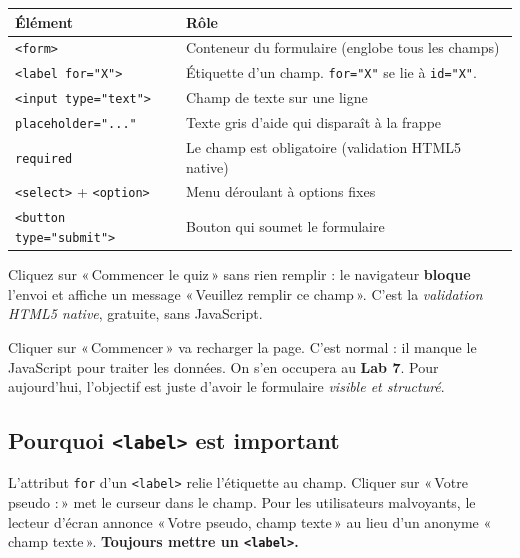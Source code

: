 \documentclass[11pt,a4paper]{article}
\begin{document}
\begin{center}
\begin{tabular}{@{}lp{8.5cm}@{}}
\toprule
\textbf{Élément} & \textbf{Rôle} \\
\midrule
\texttt{<form>} & Conteneur du formulaire (englobe tous les champs) \\
\addlinespace
\texttt{<label for="X">} & Étiquette d'un champ. \texttt{for="X"} se lie à \texttt{id="X"}. \\
\addlinespace
\texttt{<input type="text">} & Champ de texte sur une ligne \\
\addlinespace
\texttt{placeholder="..."} & Texte gris d'aide qui disparaît à la frappe \\
\addlinespace
\texttt{required}     & Le champ est obligatoire (validation HTML5 native) \\
\addlinespace
\texttt{<select>} + \texttt{<option>} & Menu déroulant à options fixes \\
\addlinespace
\texttt{<button type="submit">} & Bouton qui soumet le formulaire \\
\bottomrule
\end{tabular}
\end{center}

\begin{infobox}
Cliquez sur «\,Commencer le quiz\,» sans rien remplir : le navigateur
\textbf{bloque} l'envoi et affiche un message «\,Veuillez remplir ce
champ\,». C'est la \emph{validation HTML5 native}, gratuite, sans
JavaScript.
\end{infobox}

\begin{attentionbox}
Cliquer sur «\,Commencer\,» va recharger la page. C'est normal : il
manque le JavaScript pour traiter les données. On s'en occupera au
\textbf{Lab 7}. Pour aujourd'hui, l'objectif est juste d'avoir le
formulaire \emph{visible et structuré}.
\end{attentionbox}

\subsection{Pourquoi \texttt{<label>} est important}

L'attribut \texttt{for} d'un \texttt{<label>} relie l'étiquette au champ.
Cliquer sur «\,Votre pseudo :\,» met le curseur dans le champ. Pour les
utilisateurs malvoyants, le lecteur d'écran annonce «\,Votre pseudo,
champ texte\,» au lieu d'un anonyme «\,champ texte\,». \textbf{Toujours
mettre un \texttt{<label>}.}
\end{document}
